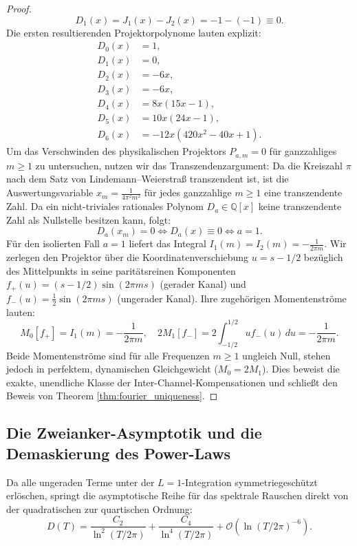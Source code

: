 \documentclass[11pt,a4paper]{article}
\theoremstyle{definition}
\begin{document}
\begin{proof}
		\begin{equation}
			D_1(x) = J_1(x) - J_2(x) = -1 - (-1) \equiv 0.
		\end{equation}
		Die ersten resultierenden Projektorpolynome lauten explizit:
		\begin{align}
			D_0(x) &= 1, \nonumber \\
			D_1(x) &= 0, \nonumber \\
			D_2(x) &= -6x, \nonumber \\
			D_3(x) &= -6x, \nonumber \\
			D_4(x) &= 8x(15x - 1), \nonumber \\
			D_5(x) &= 10x(24x - 1), \nonumber \\
			D_6(x) &= -12x(420x^2 - 40x + 1).
		\end{align}
		Um das Verschwinden des physikalischen Projektors $P_{a,m} = 0$ für ganzzahliges $m \ge 1$ zu untersuchen, nutzen wir das Transzendenzargument:
		Da die Kreiszahl $\pi$ nach dem Satz von Lindemann--Weierstraß transzendent ist, ist die Auswertungsvariable $x_m = \frac{1}{4\pi^2 m^2}$ für jedes ganzzahlige $m \ge 1$ eine transzendente Zahl. Da ein nicht-triviales rationales Polynom $D_a \in \mathbb{Q}[x]$ keine transzendente Zahl als Nullstelle besitzen kann, folgt:
		\begin{equation}
			D_a(x_m) = 0 \iff D_a(x) \equiv 0 \iff a = 1.
		\end{equation}
		Für den isolierten Fall $a=1$ liefert das Integral $I_1(m) = I_2(m) = -\frac{1}{2\pi m}$. Wir zerlegen den Projektor über die Koordinatenverschiebung $u = s - 1/2$ bezüglich des Mittelpunkts in seine paritätsreinen Komponenten $f_+(u) = (s-1/2)\sin(2\pi m s)$ (gerader Kanal) und $f_-(u) = \frac{1}{2}\sin(2\pi m s)$ (ungerader Kanal). Ihre zugehörigen Momentenströme lauten:
		\begin{equation}
			M_0[f_+] = I_1(m) = -\frac{1}{2\pi m}, \quad 2 M_1[f_-] = 2 \int_{-1/2}^{1/2} u f_-(u) \, du = -\frac{1}{2\pi m}.
		\end{equation}
		Beide Momentenströme sind für alle Frequenzen $m \ge 1$ ungleich Null, stehen jedoch in perfektem, dynamischen Gleichgewicht ($M_0 = 2M_1$). Dies beweist die exakte, unendliche Klasse der Inter-Channel-Kompensationen und schließt den Beweis von Theorem \ref{thm:fourier_uniqueness}.
	\end{proof}
	
	\subsection{Die Zweianker-Asymptotik und die Demaskierung des Power-Laws}
	Da alle ungeraden Terme unter der $L=1$-Integration symmetriegeschützt erlöschen, springt die asymptotische Reihe für das spektrale Rauschen direkt von der quadratischen zur quartischen Ordnung:
	\begin{equation}
		D(T) = \frac{C_2}{\ln^2(T/2\pi)} + \frac{C_4}{\ln^4(T/2\pi)} + \mathcal{O}\left(\ln(T/2\pi)^{-6}\right).
	\end{equation}
	
\end{document}
